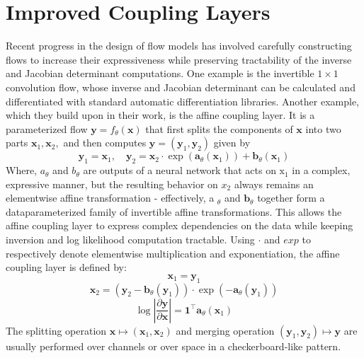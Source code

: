 \documentclass[]{IEEEtran}
\begin{document}
\section{Improved Coupling Layers}
Recent progress in the design of flow models has involved carefully constructing flows to increase their expressiveness while preserving tractability of the inverse and Jacobian determinant computations. One example is the invertible $1 \times 1$ convolution flow, whose inverse and Jacobian determinant can be calculated and differentiated with standard automatic differentiation libraries. Another example, which they build upon in their work, is the affine coupling layer. It is a parameterized flow $\mathbf{y}=f_{\theta}(\mathbf{x})$ that first splits the components of $\mathbf{x}$ into two parts $\mathbf{x}_{1}, \mathbf{x}_{2},$ and then computes $\mathbf{y}=\left(\mathbf{y}_{1}, \mathbf{y}_{2}\right)$
given by
\begin{equation}
\mathbf{y}_{1}=\mathbf{x}_{1}, \quad \mathbf{y}_{2}=\mathbf{x}_{2} \cdot \exp \left(\mathbf{a}_{\theta}\left(\mathbf{x}_{1}\right)\right)+\mathbf{b}_{\theta}\left(\mathbf{x}_{1}\right)
\label{fpp13}
\end{equation}
Where, $a_{\theta}$ and $b_{\theta}$ are outputs of a neural network that acts on $\mathrm{x}_{1}$ in a complex, expressive manner, but the resulting behavior on $x_{2}$ always remains an elementwise affine transformation - effectively, a $_{\theta}$ and $\mathbf{b}_{\theta}$ together form a dataparameterized family of invertible affine transformations. This allows the affine coupling layer to express complex dependencies on the data while keeping inversion and log likelihood computation tractable. Using $\cdot$ and $exp$ to respectively denote elementwise multiplication and exponentiation, the affine coupling layer is defined by:
\begin{equation}
\mathbf{x}_{1}=\mathbf{y}_{1} 
\label{fpp14}
\end{equation}
\begin{equation}
\mathbf{x}_{2} =\left(\mathbf{y}_{2}-\mathbf{b}_{\theta}\left(\mathbf{y}_{1}\right)\right) \cdot \exp \left(-\mathbf{a}_{\theta}\left(\mathbf{y}_{1}\right)\right) 
\label{fpp15}
\end{equation}
\begin{equation}
\log \left|\frac{\partial \mathbf{y}}{\partial \mathbf{x}}\right| =\mathbf{1}^{\top} \mathbf{a}_{\theta}\left(\mathbf{x}_{1}\right) \label{fpp16}
\end{equation}
The splitting operation $\mathbf{x} \mapsto\left(\mathbf{x}_{1}, \mathbf{x}_{2}\right)$ and merging operation $\left(\mathbf{y}_{1}, \mathbf{y}_{2}\right) \mapsto \mathbf{y}$ are usually performed over channels or over space in a checkerboard-like pattern.
\end{document}
